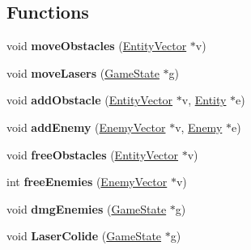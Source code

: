 \subsection*{Functions}
\begin{DoxyCompactItemize}
\item 
\mbox{\label{group__GameState_ga8cbb1ed53220589341752f92a92280cd}} 
void {\bfseries move\+Obstacles} (\hyperlink{structentityVector}{Entity\+Vector} $\ast$v)
\item 
\mbox{\label{group__GameState_ga2eb8a182e1946bad2dd230c88441fdd3}} 
void {\bfseries move\+Lasers} (\hyperlink{structgamestate__t}{Game\+State} $\ast$g)
\item 
\mbox{\label{group__GameState_ga4558505eda661a066fe43bdc72a199fc}} 
void {\bfseries add\+Obstacle} (\hyperlink{structentityVector}{Entity\+Vector} $\ast$v, \hyperlink{structentity__t}{Entity} $\ast$e)
\item 
\mbox{\label{group__GameState_gaad7be0558ab6f2c48fde48c031b4be66}} 
void {\bfseries add\+Enemy} (\hyperlink{structenemyVector}{Enemy\+Vector} $\ast$v, \hyperlink{structenemy__t}{Enemy} $\ast$e)
\item 
\mbox{\label{group__GameState_gabda123367a94f7f6c55af90c98ff6c30}} 
void {\bfseries free\+Obstacles} (\hyperlink{structentityVector}{Entity\+Vector} $\ast$v)
\item 
\mbox{\label{group__GameState_ga3dbc1552d6c6c541c29bcb92858f784a}} 
int {\bfseries free\+Enemies} (\hyperlink{structenemyVector}{Enemy\+Vector} $\ast$v)
\item 
\mbox{\label{group__GameState_ga9cfa6a0a9be547acc36e87c3c110d33f}} 
void {\bfseries dmg\+Enemies} (\hyperlink{structgamestate__t}{Game\+State} $\ast$g)
\item 
\mbox{\label{group__GameState_gaa1c267c797e5839afde5c5981c016804}} 
void {\bfseries Laser\+Colide} (\hyperlink{structgamestate__t}{Game\+State} $\ast$g)
\item 
\mbox{\label{group__GameState_ga97f733aa0eba9c30decd7d674ab00faa}} 

\end{DoxyCompactItemize}
